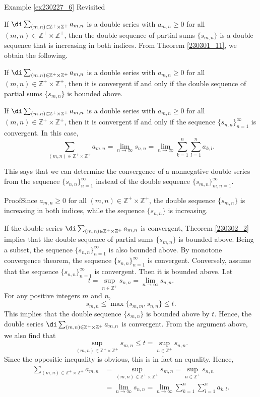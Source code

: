 \begin{example}{\linkt Example \ref{ex230227_6} Revisited}
\begin{example}[label=ex230227_13]{}
\begin{example}{}
If $\di\sum_{(m,n)\in\mathbb{Z}^+\times\mathbb{Z}^+}a_{m,n}$ is a double series with $a_{m,n}\geq 0$ for all $(m,n)\in\mathbb{Z}^+\times\mathbb{Z}^+$, then the double sequence of partial sums $\{s_{m,n}\}$ is a double sequence that is increasing in both indices.
From Theorem \ref{230301_11}, we obtain the following.
\begin{theorem}[label=230302_2]{}
If $\di\sum_{(m,n)\in\mathbb{Z}^+\times\mathbb{Z}^+}a_{m,n}$ is a double series with $a_{m,n}\geq 0$ for all $(m,n)\in\mathbb{Z}^+\times\mathbb{Z}^+$, then it is convergent if and only if the double sequence of partial sums $\{s_{m,n}\}$ is bounded above.
\end{theorem}
\begin{corollary}[label=230302_16]{}
If $\di\sum_{(m,n)\in\mathbb{Z}^+\times\mathbb{Z}^+}a_{m,n}$ is a double series with $a_{m,n}\geq 0$ for all $(m,n)\in\mathbb{Z}^+\times\mathbb{Z}^+$, then it is convergent if and only if the  sequence   $\{s_{n,n}\}_{n=1}^{\infty}$ is convergent. In this case,
\[\sum_{(m,n)\in\mathbb{Z}^+\times\mathbb{Z}^+}a_{m,n}=\lim_{n\to\infty}s_{n,n}=\lim_{n\to\infty}\sum_{k=1}^n\sum_{l=1}^na_{k,l}.\]
\end{corollary}
This says that we can determine the convergence of a nonnegative double series from the sequence $\{s_{n,n}\}_{n=1}^{\infty}$ instead of the double sequence $\{s_{m,n}\}_{m,n=1}^{\infty}$.
\begin{myproof}{Proof}Since $a_{m,n}\geq 0$ for all $(m,n)\in\mathbb{Z}^+\times\mathbb{Z}^+$, the double sequence $\{s_{m,n}\}$ is increasing in both indices, while the sequence $\{s_{n,n}\}$ is increasing.

If the double series $\di\sum_{(m,n)\in\mathbb{Z}^+\times\mathbb{Z}^+}a_{m,n}$ is convergent, Theorem \ref{230302_2} implies that the double sequence of partial sums $\{s_{m,n}\}$ is bounded above. Being a subset, the sequence   $\{s_{n,n}\}_{n=1}^{\infty}$ is also bounded above. By monotone convergence theorem,  the  sequence   $\{s_{n,n}\}_{n=1}^{\infty}$ is convergent. 
\bp
Conversely, assume that  the  sequence   $\{s_{n,n}\}_{n=1}^{\infty}$ is convergent. Then it is bounded above. Let \[t=\sup_{n\in\mathbb{Z}^+}s_{n,n}=\lim_{n\to\infty}s_{n,n}.\]For any positive integers $m$ and $n$, \[s_{m,n}\leq\max\{s_{m,m},s_{n,n}\}\leq t.\]
This implies that the double sequence   $\{s_{m,n}\}$ is bounded above by $t$. Hence, the double series $\di\sum_{(m,n)\in\mathbb{Z}^+\times\mathbb{Z}^+}a_{m,n}$ is convergent.  From the argument above, we also find that
\[\sup_{(m,n)\in\mathbb{Z}^+\times\mathbb{Z}^+}s_{m,n}\leq t=\sup_{n\in\mathbb{Z}^+}s_{n,n}.\]
Since the oppositie inequality is obvious, this is in fact an equality. Hence,
\begin{align*}\sum_{(m,n)\in\mathbb{Z}^+\times\mathbb{Z}^+}a_{m,n}&=\sup_{(m,n)\in\mathbb{Z}^+\times\mathbb{Z}^+}s_{m,n}=\sup_{n\in\mathbb{Z}^+}s_{n,n}\\&=\lim_{n\to\infty}s_{n,n}=\lim_{n\to\infty}\sum_{k=1}^n\sum_{l=1}^na_{k,l}.\end{align*}
\end{myproof}


\end{example}
\end{example}
\end{example}
